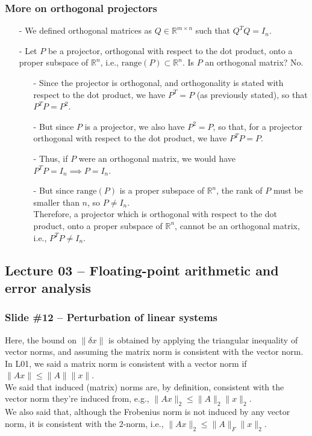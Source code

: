 \documentclass[letterpaper,10pt]{article}
\begin{document}
\subsubsection*{More on orthogonal projectors}
\begin{itemize}
\item[-] We defined orthogonal matrices as $Q\in\mathbb{R}^{m\times n}$ such that $Q^TQ=I_n$.
\item[-] Let $P$ be a projector, orthogonal with respect to the dot product, onto a proper subspace of $\mathbb{R}^n$, i.e., $\mathrm{range}(P)\subset\mathbb{R}^n$. Is $P$ an orthogonal matrix? No.
\begin{itemize}
\item[-] Since the projector is orthogonal, and orthogonality is stated with respect to the dot product, we have $P^T=P$ (as previously stated), so that $P^TP=P^2$.
\item[-] But since $P$ is a projector, we also have $P^2=P$, so that, for a projector orthogonal with respect to the dot product, we have $P^TP=P$.
\item[-] Thus, if $P$ were an orthogonal matrix, we would have $P^TP=I_n\implies P=I_n$.
\item[-] But since $\mathrm{range}(P)$ is a proper subspace of $\mathbb{R}^n$, the rank of $P$ must be smaller than $n$, so $P\neq I_n$.\vspace{.1cm}\\
Therefore, a projector which is orthogonal with respect to the dot product, onto a proper subspace of $\mathbb{R}^n$, cannot be an orthogonal matrix, i.e., $P^TP\neq I_n$.
\end{itemize}
\end{itemize}

\subsection*{Lecture 03 -- Floating-point arithmetic and error analysis}
\subsubsection*{Slide \#12 -- Perturbation of linear systems}
Here, the bound on $\|\delta x\|$ is obtained by applying the triangular inequality of vector norms, and assuming the matrix norm is consistent with the vector norm.\vspace{.1cm}\\
In L01, we said a matrix norm is consistent with a vector norm if $\|Ax\|\leq \|A\|\|x\|$.\vspace{.1cm}\\
We said that induced (matrix) norms are, by definition, consistent with the vector norm they're induced from, e.g., $\|Ax\|_2\leq \|A\|_2\|x\|_2$.\vspace{.1cm}\\
We also said that, although the Frobenius norm is not induced by any vector norm, it is consistent with the 2-norm, i.e., $\|Ax\|_2\leq \|A\|_F\|x\|_2$.
\end{document}
